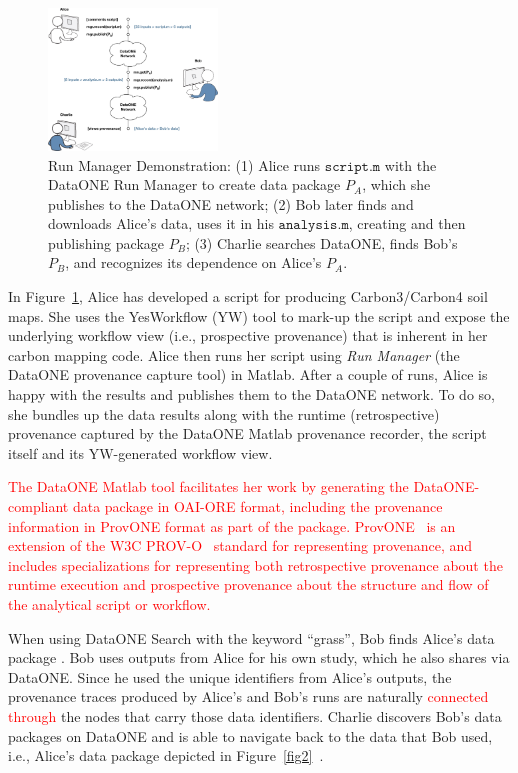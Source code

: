 \documentclass[a4paper]{llncs}
\newcommand{\mytt}[1]{\ensuremath{\mathtt{#1}}}
\begin{document}
\begin{figure}[t] \centering \includegraphics[width=0.4\textwidth]{figs/alice-bob-charlie-sequence-crop} \caption{Run Manager Demonstration: (1) Alice runs \mytt{script.m} with the DataONE Run Manager to create data package $P_A$, which she publishes to the DataONE network; (2) Bob later finds and downloads Alice's data, uses it in his \mytt{analysis.m}, creating and then publishing package $P_B$; (3) Charlie searches DataONE, finds Bob's $P_B$, and recognizes its dependence on Alice's $P_A$.}  \label{fig0} \end{figure}

In Figure~\ref{fig0}, Alice has developed a script for producing Carbon3/Carbon4 soil maps.  She uses the YesWorkflow (YW) tool to mark-up the script and expose the underlying workflow view (i.e., prospective provenance) that is inherent in her carbon mapping code. Alice then runs her script using \emph{Run Manager} (the DataONE provenance capture tool) in Matlab. After a couple of runs, Alice is happy with the results and publishes them to the DataONE network. To do so, she bundles up the data results along with the runtime (retrospective) provenance captured by the DataONE Matlab provenance recorder, the script itself and its YW-generated workflow view.

\textcolor{red}{The DataONE Matlab tool facilitates her work by generating the DataONE-compliant data package in OAI-ORE format, including the provenance information in ProvONE format as part of the package. ProvONE~\cite{provone} is an extension of the W3C PROV-O~\cite{prov-o} standard for representing provenance, and includes specializations for representing both retrospective provenance about the runtime execution and prospective provenance about the structure and flow of the analytical script or workflow.}


When using DataONE Search with the keyword ``grass'', Bob finds Alice's data package \cite{yaxing}. Bob uses outputs from Alice for his own study, which he also shares via DataONE. Since he used the unique identifiers from Alice's outputs, the provenance traces produced by Alice's and Bob's runs are naturally \textcolor{red}{connected through} the nodes that carry those data identifiers. Charlie discovers Bob's data packages on DataONE and is able to navigate back to the data that Bob used, i.e., Alice's data package depicted in Figure~\ref{fig2}~\cite{Katz,data-trajectories}.
\end{document}
